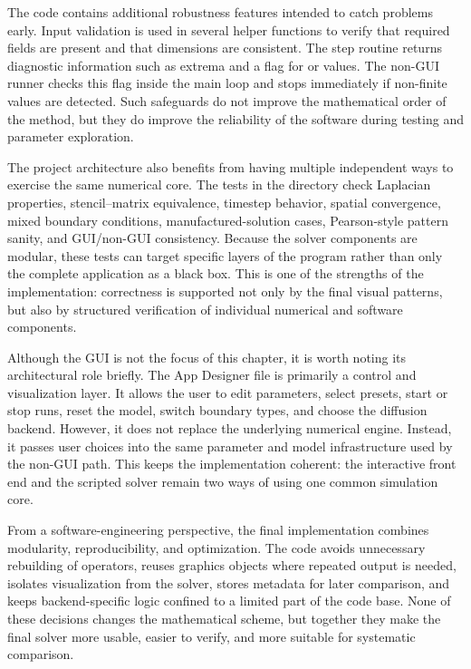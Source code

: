 The code contains additional robustness features intended to catch problems early. Input validation is used in several helper functions to verify that required fields are present and that dimensions are consistent. The step routine returns diagnostic information such as extrema and a flag for  or  values. The non-GUI runner checks this flag inside the main loop and stops immediately if non-finite values are detected. Such safeguards do not improve the mathematical order of the method, but they do improve the reliability of the software during testing and parameter exploration.

The project architecture also benefits from having multiple independent ways to exercise the same numerical core. The tests in the  directory check Laplacian properties, stencil--matrix equivalence, timestep behavior, spatial convergence, mixed boundary conditions, manufactured-solution cases, Pearson-style pattern sanity, and GUI/non-GUI consistency. Because the solver components are modular, these tests can target specific layers of the program rather than only the complete application as a black box. This is one of the strengths of the implementation: correctness is supported not only by the final visual patterns, but also by structured verification of individual numerical and software components.

Although the GUI is not the focus of this chapter, it is worth noting its architectural role briefly. The App Designer file  is primarily a control and visualization layer. It allows the user to edit parameters, select presets, start or stop runs, reset the model, switch boundary types, and choose the diffusion backend. However, it does not replace the underlying numerical engine. Instead, it passes user choices into the same parameter and model infrastructure used by the non-GUI path. This keeps the implementation coherent: the interactive front end and the scripted solver remain two ways of using one common simulation core.

From a software-engineering perspective, the final implementation combines modularity, reproducibility, and optimization. The code avoids unnecessary rebuilding of operators, reuses graphics objects where repeated output is needed, isolates visualization from the solver, stores metadata for later comparison, and keeps backend-specific logic confined to a limited part of the code base. None of these decisions changes the mathematical scheme, but together they make the final solver more usable, easier to verify, and more suitable for systematic comparison.

